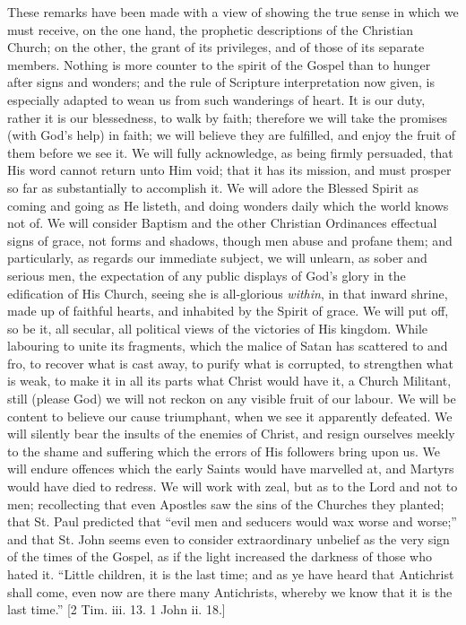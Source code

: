 These remarks have been made with a view of showing the true sense
in which we must receive, on the one hand, the prophetic descriptions
of the Christian Church; on the other, the grant of its privileges,
and of those of its separate members. Nothing is more counter to the
spirit of the Gospel than to hunger after signs and wonders; and the
rule of Scripture interpretation now given, is especially adapted to
wean us from such wanderings of heart. It is our duty, rather it is
our blessedness, to walk by faith; therefore we will take the promises
(with God's help) in faith; we will believe they are fulfilled, and
enjoy the fruit of them before we see it. We will fully acknowledge,
as being firmly persuaded, that His word cannot return unto Him void;
that it has its mission, and must prosper so far as substantially to
accomplish it. We will adore the Blessed Spirit as coming and going as
He listeth, and doing wonders daily which the world knows not of. We
will consider Baptism and the other Christian Ordinances effectual
signs of grace, not forms and shadows, though men abuse and profane
them; and particularly, as regards our immediate subject, we will
unlearn, as sober and serious men, the expectation of any public
displays of God's glory in the edification of His Church, seeing she
is all-glorious \emph{within}, in that inward shrine, made up of
faithful hearts, and inhabited by the Spirit of grace. We will put
off, so be it, all secular, all political views of the victories of
His kingdom. While labouring to unite its fragments, which the malice
of Satan has scattered to and fro, to recover what is cast away, to
purify what is corrupted, to strengthen what is weak, to make it in
all its parts what Christ would have it, a Church Militant, still
(please God) we will not reckon on any visible fruit of our labour. We
will be content to believe our cause triumphant, when we see it
apparently defeated. We will silently bear the insults of the enemies
of Christ, and resign ourselves meekly to the shame and suffering
which the errors of His followers bring upon us. We will endure
offences which the early Saints would have marvelled at, and Martyrs
would have died to redress. We will work with zeal, but as to the Lord
and not to men; recollecting that even Apostles saw the sins of the
Churches they planted; that St. Paul predicted that ``evil men and
seducers would wax worse and worse;'' and that St. John seems even
to consider extraordinary unbelief as the very sign of the times of
the Gospel, as if the light increased the darkness of those who hated
it. ``Little children, it is the last time; and as ye have heard
that Antichrist shall come, even now are there many Antichrists,
whereby we know that it is the last time.'' [2 Tim. iii. 13. 1
John ii. 18.]

